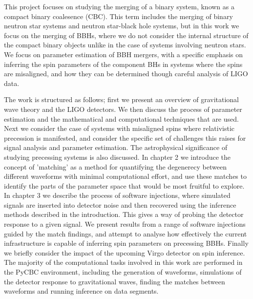 \documentclass[11pt]{article}
\begin{document}
This project focuses on studying the merging of a binary system, known as a compact binary coalesence (CBC). This term includes the merging of binary neutron star systems and neutron star-black hole systems, but in this work we focus on the merging of BBHs, where we do not consider the internal structure of the compact binary objects unlike in the case of systems involving neutron stars. We focus on parameter estimation of BBH mergers, with a specific emphasis on inferring the spin parameters of the component BHs in systems where the spins are misaligned, and how they can be determined though careful analysis of LIGO data.

The work is structured as follows; first we present an overview of gravitational wave theory and the LIGO detectors. We then discuss the process of parameter estimation and the mathematical and computational techniques that are used. Next we consider the case of systems with misaligned spins where relativistic precession is manifested, and consider the specific set of challenges this raises for signal analysis and parameter estimation. The astrophysical significance of studying precessing systems is also discussed. In chapter 2 we introduce the concept of 'matching' as a method for quantifying the degenerecy between different waveforms with minimal computational effort, and use these matches to identify the parts of the parameter space that would be most fruitful to explore. In chapter 3 we describe the process of software injections, where simulated signals are inserted into detector noise and then recovered using the inference methods described in the introduction. This gives a way of probing the detector response to a given signal. We present results from a range of software injections guided by the match findings, and attempt to analyse how effectively the current infrastructure is capable of inferring spin parameters on precessing BBHs. Finally we briefly consider the impact of the upcoming Virgo detector on spin inference. The majority of the computational tasks involved in this work are performed in the PyCBC environment\cite{pycbc}, including the generation of waveforms, simulations of the detector response to gravitational waves, finding the matches between waveforms and running inference on data segments.
\end{document}
